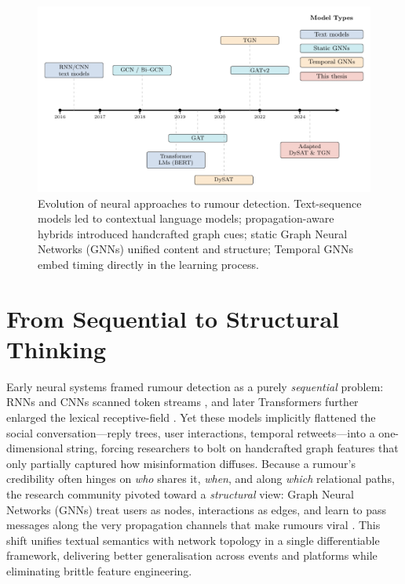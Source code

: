 \documentclass{cshonours}
\begin{document}
\begin{figure}[htbp]
  \centering
  \includegraphics[width=\textwidth]{../figures/rumour_timeline.pdf}
  \caption{Evolution of neural approaches to rumour detection.  Text-sequence models led to contextual language models; propagation-aware hybrids introduced handcrafted graph cues; static Graph Neural Networks (GNNs) unified content and structure; Temporal GNNs embed timing directly in the learning process.}
  \label{fig:timeline}
\end{figure}

\section{From Sequential to Structural Thinking}

Early neural systems framed rumour detection as a purely \emph{sequential} problem: RNNs and CNNs scanned token streams \cite{yu2017cnn}, and later Transformers further enlarged the lexical receptive-field \cite{rahman2024primer}. Yet these models implicitly flattened the social conversation—reply trees, user interactions, temporal retweets—into a one-dimensional string, forcing researchers to bolt on handcrafted graph features that only partially captured how misinformation diffuses. Because a rumour’s credibility often hinges on \emph{who} shares it, \emph{when}, and along \emph{which} relational paths, the research community pivoted toward a \emph{structural} view: Graph Neural Networks (GNNs) treat users as nodes, interactions as edges, and learn to pass messages along the very propagation channels that make rumours viral \cite{bian2020rumor}. This shift unifies textual semantics with network topology in a single differentiable framework, delivering better generalisation across events and platforms while eliminating brittle feature engineering. 
\end{document}
